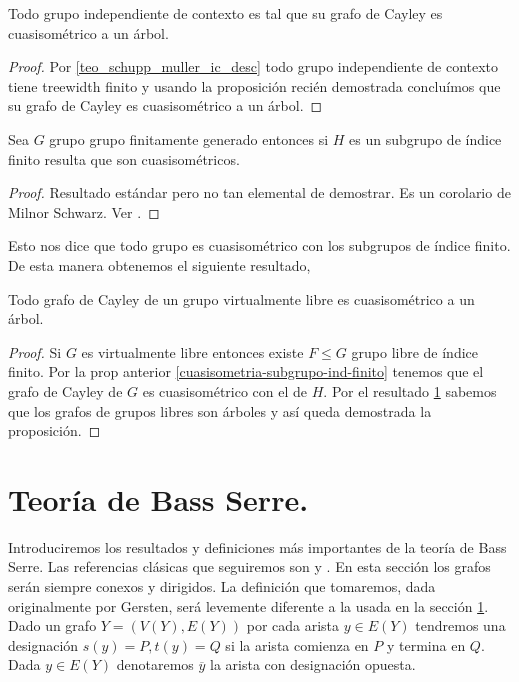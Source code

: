 \documentclass[tesis.tex]{subfiles}
\newcommand{\fg}{grupo finitamente generado }
\begin{document}
\begin{coro}
	Todo grupo independiente de contexto es tal que su grafo de Cayley es cuasisométrico a un árbol.
\end{coro}
\begin{proof}
	Por \ref{teo_schupp_muller_ic_desc} todo grupo independiente de contexto tiene treewidth finito y usando la proposición recién demostrada concluímos que su grafo de Cayley es cuasisométrico a un árbol.
\end{proof}
\medskip

\begin{prop}\label{cuasisometria-subgrupo-ind-finito}
	Sea $G$ grupo \fg entonces si $H$ es un subgrupo de índice finito resulta que son cuasisométricos.
\end{prop}
\begin{proof}
	Resultado estándar pero no tan elemental de demostrar. 
	Es un corolario de Milnor Schwarz.
	Ver \cite{loh2017geometric}.
\end{proof}

Esto nos dice que todo grupo es cuasisométrico con los subgrupos de índice finito. 
De esta manera obtenemos el siguiente resultado,

\begin{prop}
	Todo grafo de Cayley de un grupo virtualmente libre es cuasisométrico a un árbol.
\end{prop}

\begin{proof}
	Si $G$ es virtualmente libre entonces existe $F \le G$ grupo libre de índice finito.
	Por la prop anterior \ref{cuasisometria-subgrupo-ind-finito} tenemos que el grafo de Cayley de $G$ es cuasisométrico con el de $H$.
	Por el resultado \ref{} sabemos que los grafos de grupos libres son árboles y así queda demostrada la proposición.
\end{proof}

\section{Teoría de Bass Serre.}

Introduciremos los resultados y definiciones más importantes de la teoría de Bass Serre. 
Las referencias clásicas que seguiremos son \cite{serre2002trees} y \cite{}.
En esta sección los grafos serán siempre conexos y dirigidos.
La definición que tomaremos, dada originalmente por Gersten, será levemente diferente a la usada en la sección \ref{}.
Dado un grafo $Y= (V(Y),E(Y))$ por cada arista $y \in E(Y)$ tendremos una designación $s(y) = P, t(y) = Q$ si la arista comienza en $P$ y termina en $Q$.
Dada $y \in E(Y)$ denotaremos $\overline y$ la arista con designación opuesta.
\end{document}
